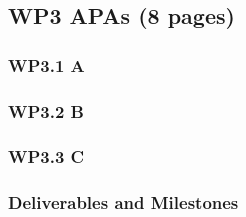 \subsection{WP3 APAs (8 pages)}
\subsubsection{WP3.1 A}
\subsubsection{WP3.2 B}
\subsubsection{WP3.3 C}

\subsubsection{Deliverables and Milestones}


